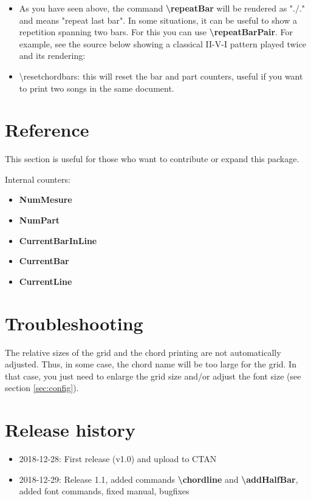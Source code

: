 \documentclass[11pt]{article}
\newcommand{\btt}{\bfseries \ttfamily }
\newcommand{\tbs}{\textbackslash{}}
\begin{document}
\begin{itemize}
\item As you have seen above, the command {\btt \tbs repeatBar} will be rendered as "./."
and means "repeat last bar".
In some situations, it can be useful to show a repetition spanning two bars.
For this you can use {\btt \tbs repeatBarPair}.
For example, see the source below showing a classical II-V-I pattern played twice and its rendering:

\noindent
\begin{minipage}{0.45\textwidth}

\end{minipage}
%
\begin{minipage}{0.42\textwidth}
\countbarsNo

\end{minipage}

\item {\ttfamily \textbackslash resetchordbars}: this will reset the bar and part counters, useful if you want to print two songs in the same document.
\end{itemize}


\section{Reference}

This section is useful for those who want to contribute or expand this package.

Internal counters:

\begin{itemize}
\item {\btt NumMesure}
\item {\btt NumPart}
\item {\btt CurrentBarInLine}
\item {\btt CurrentBar}
\item {\btt CurrentLine}
\end{itemize}

\section{Troubleshooting}

The relative sizes of the grid and the chord printing are not automatically adjusted.
Thus, in some case, the chord name will be too large for the grid.
In that case, you just need to enlarge the grid size and/or adjust the font size (see section \ref {sec:config}).

\section{Release history}

\begin{itemize}
\item 2018-12-28: First release (v1.0) and upload to CTAN

\item 2018-12-29: Release 1.1, added commands {\btt \tbs chordline} and {\btt \tbs addHalfBar}, added font commands, fixed manual, bugfixes
\end{itemize}
\end{document}

